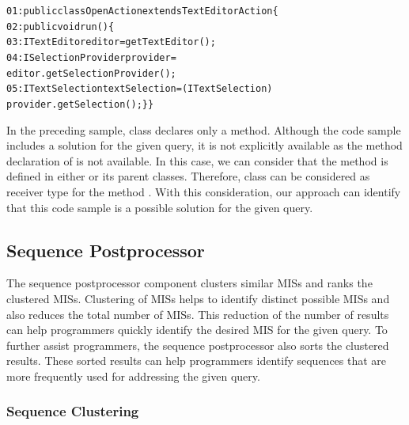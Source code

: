 \documentclass{fp035-thummalapenta}
\begin{document}
\begin{CodeOut}
\begin{alltt}
01:public class OpenAction extends TextEditorAction \{
02:\hspace*{0.1in}public void run() \{
03:\hspace*{0.3in}ITextEditor editor = getTextEditor();
04:\hspace*{0.3in}ISelectionProvider provider =
   \hspace*{0.6in}editor.getSelectionProvider();
05:\hspace*{0.3in}ITextSelection textSelection = (ITextSelection)
   \hspace*{0.6in}provider.getSelection(); \hspace*{0.1in}\}\hspace*{0.1in}\}
\end{alltt}
\end{CodeOut}

In the preceding sample, class  declares only a
 method. Although the code sample includes a solution
for the given query, it is not explicitly available as the method
declaration of  is not available. In this
case, we can consider that the method  is
defined in either  or its parent classes.
Therefore, class  can be considered as
receiver type for the method . With this consideration, our approach can
identify that this code sample is a possible solution for the given
query.
\subsection{Sequence Postprocessor}
\label{sec:miner} The sequence postprocessor component clusters similar MISs
and ranks the clustered MISs. Clustering of MISs helps to identify
distinct possible MISs and also reduces the total number of MISs.
This reduction of the number of results can help programmers quickly
identify the desired MIS for the given query. To further assist
programmers, the sequence postprocessor also sorts the clustered results.
These sorted results can help programmers identify sequences that
are more frequently used for addressing the given query.

\subsubsection{Sequence Clustering}
\label{sec:rankingCriteria}
\end{document}
